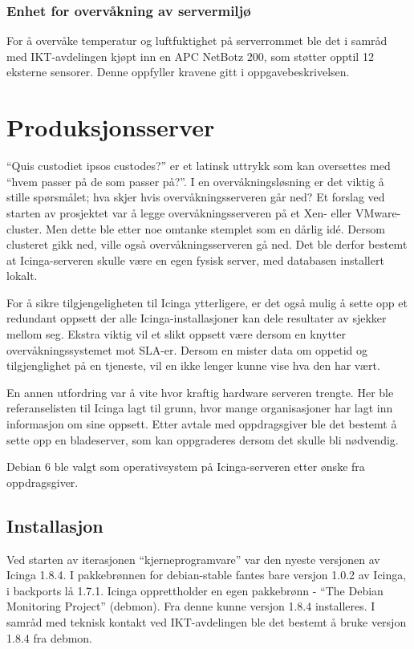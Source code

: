 \subsubsection{Enhet for overvåkning av servermiljø}
For å overvåke temperatur og luftfuktighet på serverrommet ble det i samråd med IKT-avdelingen kjøpt inn en APC NetBotz 200, som støtter opptil 12 eksterne sensorer\cite{netbotz}. Denne oppfyller kravene gitt i oppgavebeskrivelsen. 

\section{Produksjonsserver}
``Quis custodiet ipsos custodes?'' er et latinsk uttrykk som kan oversettes med ``hvem passer på de som passer på?''. I en overvåkningsløsning er det viktig å stille spørsmålet; hva skjer hvis overvåkningsserveren går ned? Et forslag ved starten av prosjektet var å legge overvåkningsserveren på et Xen- eller VMware-cluster. Men dette ble etter noe omtanke stemplet som en dårlig idé. Dersom clusteret gikk ned, ville også overvåkningsserveren gå ned. Det ble derfor bestemt at Icinga-serveren skulle være en egen fysisk server, med databasen installert lokalt.

For å sikre tilgjengeligheten til Icinga ytterligere, er det også mulig å sette opp et redundant oppsett der alle Icinga-installasjoner kan dele resultater av sjekker mellom seg. Ekstra viktig vil et slikt oppsett være dersom en knytter overvåkningssystemet mot SLA-er. Dersom en mister data om oppetid og tilgjenglighet på en tjeneste, vil en ikke lenger kunne vise hva den har vært.

En annen utfordring var å vite hvor kraftig hardware serveren trengte. Her ble referanselisten til Icinga lagt til grunn, hvor mange organisasjoner har lagt inn informasjon om sine oppsett\cite{icingainaction}. Etter avtale med oppdragsgiver ble det bestemt å sette opp en bladeserver, som kan oppgraderes dersom det skulle bli nødvendig. 

Debian 6 ble valgt som operativsystem på Icinga-serveren etter ønske fra oppdragsgiver. 
\subsection{Installasjon}
Ved starten av iterasjonen ``kjerneprogramvare'' var den nyeste versjonen av Icinga 1.8.4. I pakkebrønnen for debian-stable fantes bare versjon 1.0.2 av Icinga, i backports lå 1.7.1. Icinga opprettholder en egen pakkebrønn - ``The Debian Monitoring Project''\cite{debmon} (debmon). Fra denne kunne versjon 1.8.4 installeres. I samråd med teknisk kontakt ved IKT-avdelingen ble det bestemt å bruke versjon 1.8.4 fra debmon.

